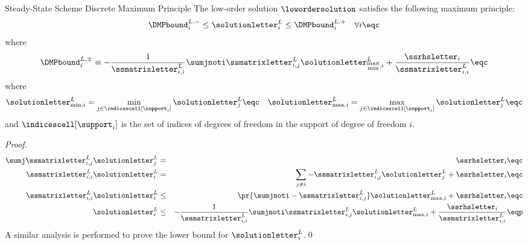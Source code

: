 \begin{theorem}{Steady-State Scheme Discrete Maximum Principle} The low-order
solution $\lowordersolution$ satisfies the following maximum principle:
\begin{equation}\label{eq:DMP_ss}
   \DMPbound_i^{L,-} \leq \solutionletter_i^L
     \leq \DMPbound_i^{L,+}\quad\forall i \eqc
\end{equation}
where
\begin{equation}
   \DMPbound_i^{L,\pm} \equiv -\frac{1}{\ssmatrixletter^L_{i,i}}
      \sumjnoti\ssmatrixletter^L_{i,j}
      \solutionletter_{\substack{\max\\\min},i}^L
      + \frac{\ssrhsletter_i}{\ssmatrixletter^L_{i,i}} \eqc
\end{equation}
where
\[
  \solutionletter_{\min,i}^L = \min\limits_{j\in\indicescell[\support_i]}
    \solutionletter_j^L
  \eqc\quad
  \solutionletter_{\max,i}^L = \max\limits_{j\in\indicescell[\support_i]}
    \solutionletter_j^L
  \eqc
\]
and $\indicescell[\support_i]$ is the set of indices of degrees of freedom in
the support of degree of freedom $i$.
\end{theorem}

\begin{proof}
\begin{eqnarray*}
  \sumj\ssmatrixletter^L_{i,j}\solutionletter_j^L & = & \ssrhsletter_i\eqc\\
  \ssmatrixletter^L_{i,i}\solutionletter_i^L      & = & \sum\limits_{j\ne i}
    - \ssmatrixletter^L_{i,j}\solutionletter_j^L + \ssrhsletter_i\eqc\\
  \ssmatrixletter^L_{i,i}\solutionletter_i^L      & \le &
    \pr{\sumjnoti -\ssmatrixletter^L_{i,j}}\solutionletter_{\max,i}^L
    + \ssrhsletter_i\eqc\\
  \solutionletter_i^L & \le & -\frac{1}{\ssmatrixletter^L_{i,i}}
    \sumjnoti\ssmatrixletter^L_{i,j}\solutionletter_{\max,i}^L
    + \frac{\ssrhsletter_i}{\ssmatrixletter^L_{i,i}} \eqp
\end{eqnarray*}
A similar analysis is performed to prove the lower bound for
$\solutionletter_i^L$.\qed
\end{proof}
